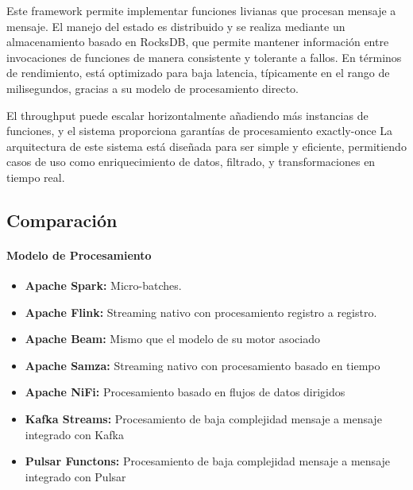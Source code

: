 Este framework permite implementar funciones livianas que procesan mensaje a mensaje. 
El manejo del estado es distribuido y se realiza mediante un almacenamiento basado en RocksDB, que permite mantener información 
entre invocaciones de funciones de manera consistente y tolerante a fallos. En términos de rendimiento, está optimizado para baja latencia, típicamente en el rango de milisegundos, 
gracias a su modelo de procesamiento directo. \newline

El throughput puede escalar horizontalmente añadiendo más instancias de funciones, y el sistema proporciona garantías de procesamiento exactly-once 
La arquitectura de este sistema está diseñada para ser simple y eficiente, permitiendo casos de uso como enriquecimiento de datos, filtrado, y transformaciones 
en tiempo real.


\newpage
\subsection{Comparación}

\paragraph{Modelo de Procesamiento}
\begin{itemize}
    \item \textbf{Apache Spark:} Micro-batches.
    \item \textbf{Apache Flink:} Streaming nativo con procesamiento registro a registro.
    \item \textbf{Apache Beam:} Mismo que el modelo de su motor asociado 
    \item \textbf{Apache Samza:} Streaming nativo con procesamiento basado en tiempo
    \item \textbf{Apache NiFi:} Procesamiento basado en flujos de datos dirigidos
    \item \textbf{Kafka Streams:} Procesamiento de baja complejidad mensaje a mensaje integrado con Kafka
    \item \textbf{Pulsar Functons:} Procesamiento de baja complejidad mensaje a mensaje integrado con Pulsar
\end{itemize}

